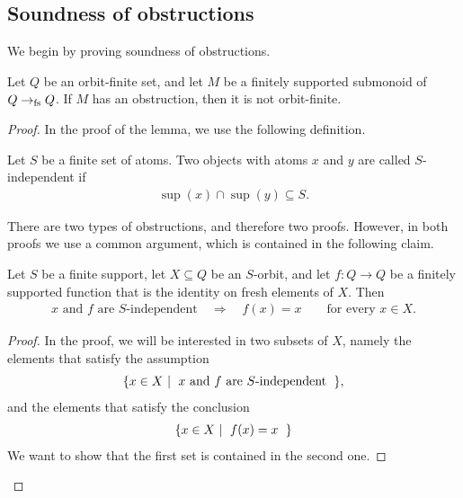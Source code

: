 \subsection{Soundness of obstructions}
\label{sec:soundness-of-obstructions}
We begin by proving soundness of obstructions.
\begin{lemma}[Soundness]
    Let $Q$ be an orbit-finite set, and let $M$ be a finitely supported submonoid of $Q \to_{\text{fs}} Q$.
    If $M$ has an obstruction, then it is not orbit-finite.
\end{lemma}
\begin{proof}
    In the proof of the lemma, we use the following definition.
    \begin{definition}
        Let $S$ be a finite set of atoms.
        Two objects with atoms $x$ and $y$ are called $S$-independent if 
        \begin{align*}
        \sup(x) \cap \sup(y) \subseteq S.
        \end{align*}
    \end{definition}
    There are two types of obstructions, and therefore two proofs. However, in both proofs we use a common argument, which is contained in the following claim.

    \begin{claim}\label{claim:fresh-wrt-f}
        Let $S$ be a finite support,  let  $X \subseteq Q$ be an $S$-orbit, and let $f : Q \to Q$ be a finitely supported function that is the identity on fresh elements of  $X$. Then 
        \begin{align*}
        \text{$x$ and $f$ are  $S$-independent}
        \quad \Rightarrow \quad 
        f(x)=x
        \qquad \text{for every } x \in X.
        \end{align*}
    \end{claim}
    \begin{proof}
        In the proof, we will be interested in two subsets of $X$, namely the elements that satisfy the assumption
                \begin{align}\label{eq:fresh-wrt-f}
        \setbuild{ x \in X}{$x$ and $f$ are $S$-independent},
        \end{align}
        and the elements that satisfy the conclusion
        \begin{align}
        \label{eq:fixpoints-of-f}
        \setbuild{x \in X}{$f(x)=x$}
        \end{align}
        We want to show that the first set is contained in the second one.
    

\end{proof}
\end{proof}
